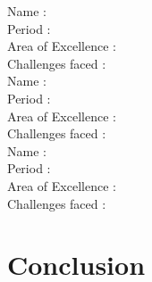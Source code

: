 \documentclass[a4paper,10pt]{article}
\begin{document}
\newblock
Name : \\
Period : \\
Area of Excellence : \\
Challenges faced : \\

\newblock
Name : \\
Period : \\
Area of Excellence : \\
Challenges faced : \\

\newblock
Name : \\
Period : \\
Area of Excellence : \\
Challenges faced : \\

\section{Conclusion}
\end{document}
